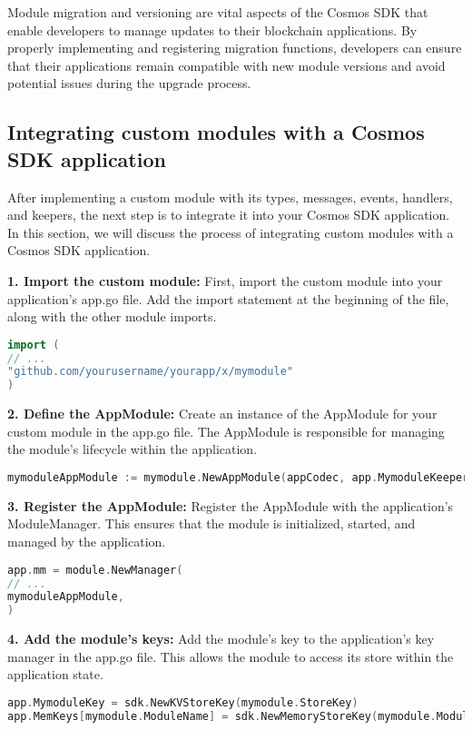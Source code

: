 \documentclass{article}
\begin{document}
Module migration and versioning are vital aspects of the Cosmos SDK that enable developers to manage updates to their blockchain applications. By properly implementing and registering migration functions, developers can ensure that their applications remain compatible with new module versions and avoid potential issues during the upgrade process.

\subsection{Integrating custom modules with a Cosmos SDK application}

After implementing a custom module with its types, messages, events, handlers, and keepers, the next step is to integrate it into your Cosmos SDK application. In this section, we will discuss the process of integrating custom modules with a Cosmos SDK application.

\textbf{1. Import the custom module:} First, import the custom module into your application's app.go file. Add the import statement at the beginning of the file, along with the other module imports.

\begin{lstlisting}[language=Go]
import (
// ...
"github.com/yourusername/yourapp/x/mymodule"
)
\end{lstlisting}

\textbf{2. Define the AppModule:} Create an instance of the AppModule for your custom module in the app.go file. The AppModule is responsible for managing the module's lifecycle within the application.

\begin{lstlisting}[language=Go]
mymoduleAppModule := mymodule.NewAppModule(appCodec, app.MymoduleKeeper)
\end{lstlisting}

\textbf{3. Register the AppModule:} Register the AppModule with the application's ModuleManager. This ensures that the module is initialized, started, and managed by the application.

\begin{lstlisting}[language=Go]
app.mm = module.NewManager(
// ...
mymoduleAppModule,
)
\end{lstlisting}

\textbf{4. Add the module's keys:} Add the module's key to the application's key manager in the app.go file. This allows the module to access its store within the application state.

\begin{lstlisting}[language=Go]
app.MymoduleKey = sdk.NewKVStoreKey(mymodule.StoreKey)
app.MemKeys[mymodule.ModuleName] = sdk.NewMemoryStoreKey(mymodule.ModuleName)
\end{lstlisting}
\end{document}
